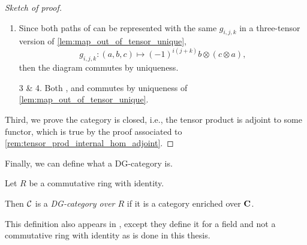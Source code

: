 \begin{proof}[Sketch of proof]
\begin{enumerate}
{\begin{center}
            \end{center}
            commutes.

            Let \( a \in A_i \) and \( b \in B_j \), and consider the following equation,
            \begin{align*}
                (g \otimes f)_{i + j} \circ s_{i + j} (a \otimes b) &= (g \otimes f)_{i + j} ((-1)^{ij}b \otimes a) \\
                &= (-1)^{ij} g_j(b) \otimes f_i(a) \\
                &= s_{i + j}(f_i(a) \otimes g_j(b)) \\
                &= s_{i + j} \circ (f \otimes g)_{i + j} (a \otimes b).
            \end{align*}
            By the above equation, along with the uniqueness of \autoref{lem:map_out_of_tensor_unique}, the above diagram commutes.
        }
        \item {
            Since both paths of \cite[Diagram 6.3]{Borceux_1994} can be represented with the same \( g_{i, j, k} \) in a three-tensor version of \autoref{lem:map_out_of_tensor_unique},
            \[
                g_{i, j, k}: (a, b, c) \mapsto (-1)^{i(j + k)}b \otimes (c \otimes a),
            \]
            then the diagram commutes by uniqueness.
        }
        \item[3 \& 4.] {
            Both \cite[Diagram 6.4]{Borceux_1994}, and \cite[Diagram 6.5]{Borceux_1994} commutes by uniqueness of \autoref{lem:map_out_of_tensor_unique}.
        }
    \end{enumerate}

    Third, we prove the category is closed, i.e., the tensor product is adjoint to some functor, which is true by the proof associated to \autoref{rem:tensor_prod_internal_hom_adjoint}.
\end{proof}

Finally, we can define what a DG-category is.

\begin{definition}[DG-category]
    \label{def:dg_cat}
    Let \( R \) be a commutative ring with identity.

    Then \( {\mathcal{C}} \) is a \emph{DG-category over \( R \)} if it is a category enriched over \( \operatorname{\mathbf{C}} \).
\end{definition}

This definition also appears in \cite[p.\ 29]{Jasso-Muro_2023}, except they define it for a field and not a commutative ring with identity as is done in this thesis.
